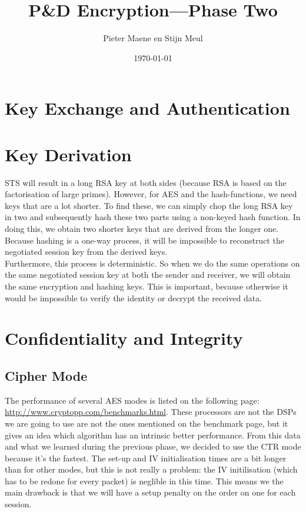 \documentclass[a4paper]{article}
\title{P\&D Encryption---Phase Two}
\author{Pieter Maene en Stijn Meul}
\date{\today}
\begin{document}
\maketitle

\section{Key Exchange and Authentication}

\section{Key Derivation}

STS will result in a long RSA key at both sides (because RSA is based on the factorisation of large primes). However, for AES and the hash-functions, we need keys that are a lot shorter. To find these, we can simply chop the long RSA key in two and subsequently hash these two parts using a non-keyed hash function. In doing this, we obtain two shorter keys that are derived from the longer one. Because hashing is a one-way process, it will be impossible to reconstruct the negotiated session key from the derived keys.\\

Furthermore, this process is deterministic. So when we do the same operations on the same negotiated session key at both the sender and receiver, we will obtain the same encryption and hashing keys. This is important, because otherwise it would be impossible to verify the identity or decrypt the received data.\\

\section{Confidentiality and Integrity}

\subsection{Cipher Mode}

The performance of several AES modes is listed on the following page: \url{http://www.cryptopp.com/benchmarks.html}. These processors are not the DSPs we are going to use are not the ones mentioned on the benchmark page, but it gives an idea which algorithm has an intrinsic better performance. From this data and what we learned during the previous phase, we decided to use the CTR mode because it's the fastest. The set-up and IV initialisation times are a bit longer than for other modes, but this is not really a problem: the IV initilisation (which has to be redone for every packet) is neglible in this time. This means we the main drawback is that we will have a setup penalty on the order on one {\micro\second} for each session.\\
\end{document}
